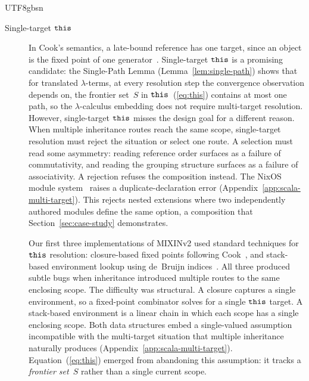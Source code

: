 \begin{CJK*}{UTF8}{gbsn}
\begin{description}
  \item[Single-target $\mathtt{this}$]
    \begin{sloppypar}
    In Cook's semantics, a late-bound reference has one target, since an object is the fixed point of
    one generator~\cite{cook1989-denotational-inheritance}.
    Single-target $\mathtt{this}$ is a promising candidate:
    the Single-Path Lemma (Lemma~\ref{lem:single-path}) shows that
    for translated $\lambda$-terms, at every resolution step the
    convergence observation depends on, the frontier set~$S$ in
    $\mathtt{this}$~(\ref{eq:this}) contains at most one path,
    so the $\lambda$-calculus embedding does not require
    multi-target resolution.
    However, single-target $\mathtt{this}$ misses the design goal for a
    different reason.
    When multiple inheritance routes reach the same scope,
    single-target resolution must reject the situation or select
    one route.
    A selection must read some asymmetry: reading reference order
    surfaces as a failure of commutativity, and reading the grouping
    structure surfaces as a failure of associativity.
    A rejection refuses the composition instead.
    The NixOS module system~\cite{nixos-contributors-nixos-modules} raises a
    duplicate-declaration error
    (Appendix~\ref{app:scala-multi-target}).
    This rejects nested extensions where two independently authored
    modules define the same option, a composition that
    Section~\ref{sec:case-study} demonstrates.
    \end{sloppypar}

    Our first three implementations of MIXINv2 used
    standard techniques for $\mathtt{this}$ resolution: closure-based
    fixed points following Cook~\cite{cook1989-denotational-inheritance}, and
    stack-based environment lookup using de~Bruijn
    indices~\cite{debruijn1972-nameless-dummies}.
    All three produced subtle bugs when inheritance introduced
    multiple routes to the same enclosing scope.
    The difficulty was structural.
    A closure captures a single environment, so a fixed-point
    combinator solves for a single $\mathtt{this}$ target.
    A stack-based environment is a linear chain in which each scope
    has a single enclosing scope.
    Both data structures embed a single-valued assumption
    incompatible with the multi-target situation that multiple
    inheritance naturally produces
    (Appendix~\ref{app:scala-multi-target}).
    Equation~(\ref{eq:this}) emerged from abandoning this
    assumption: it tracks a \emph{frontier set}~$S$ rather than a
    single current scope.
\end{description}


\end{CJK*}
